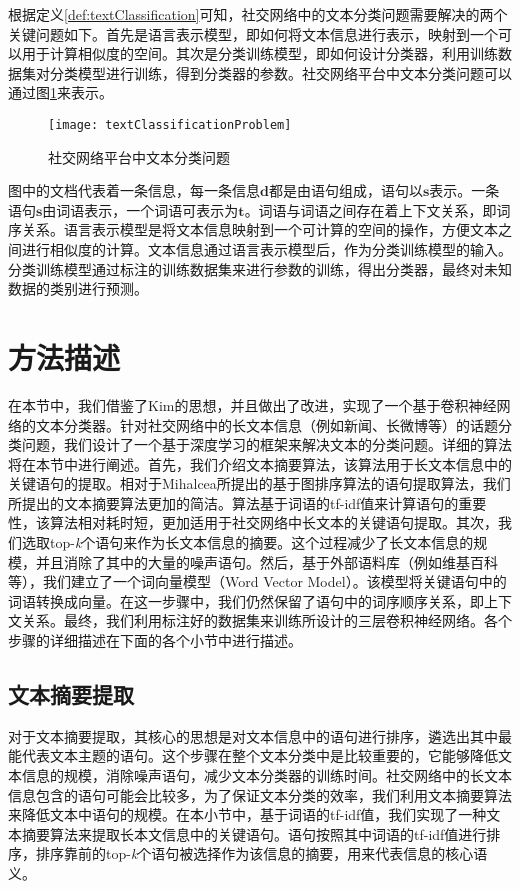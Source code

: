 根据定义\ref{def:textClassification}可知，社交网络中的文本分类问题需要解决的两个关键问题如下。首先是语言表示模型，即如何将文本信息进行表示，映射到一个可以用于计算相似度的空间。其次是分类训练模型，即如何设计分类器，利用训练数据集对分类模型进行训练，得到分类器的参数。社交网络平台中文本分类问题可以通过图\ref{fig:textClassificationProblem}来表示。

\begin{figure}[!htbp] %
  \centering
  \texttt{[image: textClassificationProblem]}
  \caption{社交网络平台中文本分类问题}
  \label{fig:textClassificationProblem}
\end{figure}

图中的文档代表着一条信息，每一条信息$\mathbf{d}$都是由语句组成，语句以$\mathbf{s}$表示。一条语句$\mathbf{s}$由词语表示，一个词语可表示为$\mathbf{t}$。词语与词语之间存在着上下文关系，即词序关系。语言表示模型是将文本信息映射到一个可计算的空间的操作，方便文本之间进行相似度的计算。文本信息通过语言表示模型后，作为分类训练模型的输入。分类训练模型通过标注的训练数据集来进行参数的训练，得出分类器，最终对未知数据的类别进行预测。

\section{方法描述}
\label{sec3:method}
在本节中，我们借鉴了Kim的思想，并且做出了改进，实现了一个基于卷积神经网络的文本分类器。针对社交网络中的长文本信息（例如新闻、长微博等）的话题分类问题，我们设计了一个基于深度学习的框架来解决文本的分类问题。详细的算法将在本节中进行阐述。首先，我们介绍文本摘要算法，该算法用于长文本信息中的关键语句的提取。相对于Mihalcea所提出的基于图排序算法的语句提取算法，我们所提出的文本摘要算法更加的简洁。算法基于词语的tf-idf值来计算语句的重要性，该算法相对耗时短，更加适用于社交网络中长文本的关键语句提取。其次，我们选取top-\textit{k}个语句来作为长文本信息的摘要。这个过程减少了长文本信息的规模，并且消除了其中的大量的噪声语句。然后，基于外部语料库（例如维基百科等），我们建立了一个词向量模型（Word Vector Model）。该模型将关键语句中的词语转换成向量。在这一步骤中，我们仍然保留了语句中的词序顺序关系，即上下文关系。最终，我们利用标注好的数据集来训练所设计的三层卷积神经网络。各个步骤的详细描述在下面的各个小节中进行描述。

\subsection{文本摘要提取}
\label{subsec3:abstactExtract}
对于文本摘要提取，其核心的思想是对文本信息中的语句进行排序，遴选出其中最能代表文本主题的语句。这个步骤在整个文本分类中是比较重要的，它能够降低文本信息的规模，消除噪声语句，减少文本分类器的训练时间。社交网络中的长文本信息包含的语句可能会比较多，为了保证文本分类的效率，我们利用文本摘要算法来降低文本中语句的规模。在本小节中，基于词语的tf-idf值，我们实现了一种文本摘要算法来提取长本文信息中的关键语句。语句按照其中词语的tf-idf值进行排序，排序靠前的top-\textit{k}个语句被选择作为该信息的摘要，用来代表信息的核心语义。

